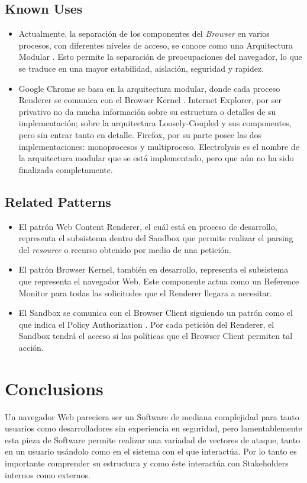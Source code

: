 \documentclass{sig-alternate-05-2015}
\begin{document}
  \subsection*{Known Uses}
  \begin{itemize}
    \item Actualmente, la separación de los componentes del \textit{Browser} en varios procesos, con diferentes niveles de acceso, se conoce como una Arquitectura Modular \cite{Vrbanec2013}. Esto permite la separación de preocupaciones del navegador, lo que se traduce en una mayor estabilidad, aislación, seguridad y rapidez.
    \item Google Chrome se basa en la arquitectura modular, donde cada proceso Renderer se comunica con el Browser Kernel \cite{multiProcGC}. Internet Explorer, por ser privativo no da mucha información sobre su estructura o detalles de su implementación; \cite{Crowley2010} sobre la arquitectura Loosely-Coupled \cite{IE8-LCIE} y sus componentes, pero sin entrar tanto en detalle. Firefox, por su parte posee las dos implementaciones: monoprocesos y multiproceso. Electrolysis es el nombre de la arquitectura modular que se está implementado, pero que aún no ha sido finalizada completamente.
  \end{itemize}

  \subsection*{Related Patterns}
  \begin{itemize}
    \item El patrón Web Content Renderer, el cuál está en proceso de desarrollo, representa el subsistema dentro del Sandbox que permite realizar el parsing del \textit{resource} o recurso obtenido por medio de una petición.
    \item El patrón Browser Kernel, también en desarrollo, representa el subsistema que representa el navegador Web. Este componente actua como un Reference Monitor \cite{fernandez2013security} para todas las solicitudes que el Renderer llegara a necesitar.
    \item El Sandbox se comunica con el Browser Client siguiendo un patrón como el que indica el Policy Authorization \cite{fernandez2013security}. Por cada petición del Renderer, el Sandbox tendrá el acceso si las políticas que el Browser Client permiten tal acción.
  \end{itemize}

\section*{Conclusions}
Un navegador Web pareciera ser un Software de mediana complejidad para tanto usuarios como desarrolladores sin experiencia en seguridad, pero lamentablemente esta pieza de Software permite realizar una variadad de vectores de ataque, tanto en un usuario usándolo como en el sistema con el que interactúa. Por lo tanto es importante comprender su estructura y como éste interactúa con Stakeholders internos como externos.
\end{document}
